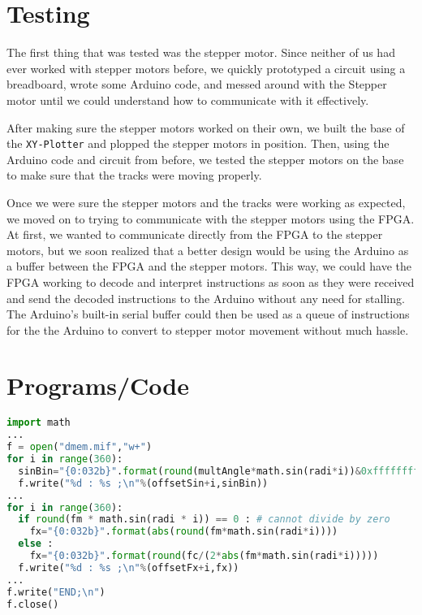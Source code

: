 \documentclass[12pt]{article}
\begin{document}


\section{Testing}
The first thing that was tested was the stepper motor. Since neither of us had ever worked with stepper motors before, we quickly prototyped a circuit using a breadboard, wrote some Arduino code, and messed around with the Stepper motor until we could understand how to communicate with it effectively. 

After making sure the stepper motors worked on their own, we built the base of the {\tt XY-Plotter} and plopped the stepper motors in position. Then, using the Arduino code and circuit from before, we tested the stepper motors on the base to make sure that the tracks were moving properly.

Once we were sure the stepper motors and the tracks were working as expected, we moved on to trying to communicate with the stepper motors using the FPGA. At first, we wanted to communicate directly from the FPGA to the stepper motors, but we soon realized that a better design would be using the Arduino as a buffer between the FPGA and the stepper motors. This way, we could have the FPGA working to decode and interpret instructions as soon as they were received and send the decoded instructions to the Arduino without any need for stalling. The Arduino's built-in serial buffer could then be used as a queue of instructions for the the Arduino to convert to stepper motor movement without much hassle.
\newpage
\section{Programs/Code}

\begin{lstlisting}[language=python, caption={Python Code for generating Lookup Tables in dmem.mif}, captionpos=b]
import math
... 
f = open("dmem.mif","w+")
for i in range(360):
  sinBin="{0:032b}".format(round(multAngle*math.sin(radi*i))&0xffffffff)
  f.write("%d : %s ;\n"%(offsetSin+i,sinBin))
...
for i in range(360):
  if round(fm * math.sin(radi * i)) == 0 : # cannot divide by zero
    fx="{0:032b}".format(abs(round(fm*math.sin(radi*i))))
  else :
    fx="{0:032b}".format(round(fc/(2*abs(fm*math.sin(radi*i)))))
  f.write("%d : %s ;\n"%(offsetFx+i,fx))
...
f.write("END;\n")
f.close()
\end{lstlisting}
\end{document}
